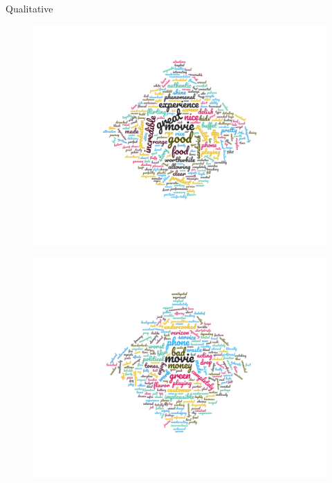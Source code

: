 \documentclass{beamer}
\begin{document}
\begin{frame}{Qualitative}
\begin{figure}
\centering
\begin{minipage}{.5\textwidth}
  \centering
  \includegraphics[width=1.35\linewidth]{Figures/yake_pos.png}
  \label{fig:test1}
\end{minipage}%
\begin{minipage}{.5\textwidth}
  \centering
  \includegraphics[width=1.35\linewidth]{Figures/yake_neg.png}
  \label{fig:test2}
\end{minipage}
\end{figure}
\end{frame}
\end{document}
